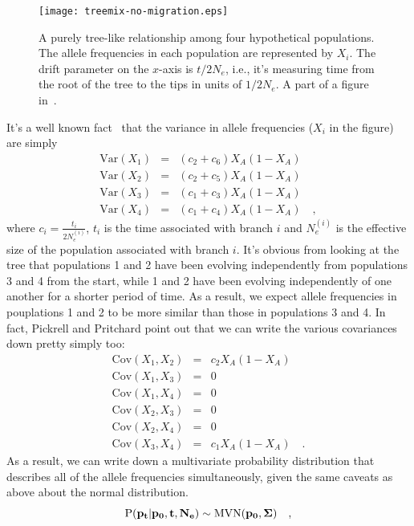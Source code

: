 \documentclass[12pt]{article}
\begin{document}
\begin{figure}
  \begin{center}
    \texttt{[image: treemix-no-migration.eps]}
  \end{center}
  \caption{A purely tree-like relationship among four hypothetical
    populations. The allele frequencies in each population are
    represented by $X_i$. The drift parameter on the $x$-axis is $t/2N_e$,
    i.e., it's measuring time from the root of the tree to the tips in
    units of $1/2N_e$. A part of a figure in~\cite{Pickrell-Pritchard-2012}.}\label{fig:treemix-no-migration}
\end{figure}

It's a well known fact~\cite{CavalliSforza-Edwards-1967} that the
variance in allele frequencies ($X_i$ in the figure) are simply
\begin{eqnarray*}
  \mbox{Var}(X_1) &=& (c_2 + c_6)X_A(1-X_A) \\
  \mbox{Var}(X_2) &=& (c_2 + c_5)X_A(1-X_A) \\
  \mbox{Var}(X_3) &=& (c_1 + c_3)X_A(1-X_A) \\
  \mbox{Var}(X_4) &=& (c_1 + c_4)X_A(1-X_A) \quad ,
\end{eqnarray*}
where $c_i = \frac{t_i}{2N_e^{(i)}}$, $t_i$ is the time associated
with branch $i$ and $N_e^{(i)}$ is the effective size of the
population associated with branch $i$. It's obvious from looking at
the tree that populations 1 and 2 have been evolving independently
from populations 3 and 4 from the start, while 1 and 2 have been
evolving independently of one another for a shorter period of time. As
a result, we expect allele frequencies in pouplations 1 and 2 to be
more similar than those in populations 3 and 4. In fact, Pickrell and
Pritchard point out that we can write the various covariances down
pretty simply too:
\begin{eqnarray*}
  \mbox{Cov}(X_1,X_2) &=& c_2X_A(1-X_A) \\
  \mbox{Cov}(X_1,X_3) &=& 0 \\
  \mbox{Cov}(X_1,X_4) &=& 0 \\
  \mbox{Cov}(X_2,X_3) &=& 0 \\
  \mbox{Cov}(X_2,X_4) &=& 0 \\
  \mbox{Cov}(X_3,X_4) &=& c_1X_A(1-X_A) \quad .
\end{eqnarray*}
As a result, we can write down a multivariate probability distribution
that describes all of the allele frequencies simultaneously, given the
same caveats as above about the normal distribution.
\[
  \mbox{P}(\bf p_t|\bf p_0, \bf t, \bf N_e) \sim \mbox{MVN}(\bf p_0,
  \bf \Sigma) \quad ,
\]
\end{document}
